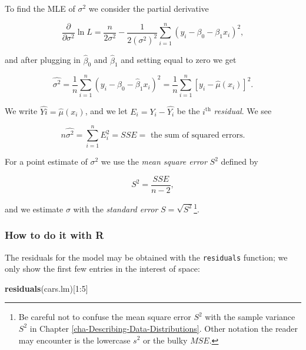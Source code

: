 \documentclass[]{book}
\newenvironment{Shaded}{\begin{snugshade}}{\end{snugshade}}
\newcommand{\KeywordTok}[1]{\textcolor[rgb]{0.13,0.29,0.53}{\textbf{{#1}}}}
\newcommand{\DecValTok}[1]{\textcolor[rgb]{0.00,0.00,0.81}{{#1}}}
\newcommand{\NormalTok}[1]{{#1}}
\let\rmarkdownfootnote\footnote%
\def\footnote{\protect\rmarkdownfootnote}
\numberwithin{equation}{chapter}
\numberwithin{figure}{chapter}
\theoremstyle{plain}
\theoremstyle{definition}
\theoremstyle{remark}
\theoremstyle{definition}
\theoremstyle{definition}
\theoremstyle{remark}
\begin{document}
To find the MLE of \(\sigma^{2}\) we consider the partial derivative

\begin{equation}
\frac{\partial}{\partial\sigma^{2}}\ln L=\frac{n}{2\sigma^{2}}-\frac{1}{2(\sigma^{2})^{2}}\sum_{i=1}^{n}(y_{i}-\beta_{0}-\beta_{1}x_{i})^{2},
\end{equation}

and after plugging in \(\hat{\beta}_{0}\) and \(\hat{\beta}_{1}\) and
setting equal to zero we get

\begin{equation}
\hat{\sigma^{2}}=\frac{1}{n}\sum_{i=1}^{n}(y_{i}-\hat{\beta}_{0}-\hat{\beta}_{1}x_{i})^{2}=\frac{1}{n}\sum_{i=1}^{n}[y_{i}-\hat{\mu}(x_{i})]^{2}.
\end{equation}

We write \(\hat{Yi}=\hat{\mu}(x_{i})\), and we let
\(E_{i}=Y_{i}-\hat{Y_{i}}\) be the \(i^{\mathrm{th}}\) \emph{residual}.
We see

\begin{equation}
n\hat{\sigma^{2}}=\sum_{i=1}^{n}E_{i}^{2}=SSE=\mbox{ the sum of squared errors.}
\end{equation}

For a point estimate of \(\sigma^{2}\) we use the \emph{mean square
error} \(S^{2}\) defined by

\begin{equation}
S^{2}=\frac{SSE}{n-2},
\end{equation}

and we estimate \(\sigma\) with the \emph{standard error}
\(S=\sqrt{S^{2}}\)\footnote{Be careful not to confuse the mean square
  error \(S^{2}\) with the sample variance \(S^{2}\) in Chapter
  \ref{cha-Describing-Data-Distributions}. Other notation the reader may
  encounter is the lowercase \(s^{2}\) or the bulky \(MSE\).}.

\subsubsection{How to do it with R}\label{how-to-do-it-with-r-50}

The residuals for the model may be obtained with the \texttt{residuals}
function; we only show the first few entries in the interest of space:

\begin{Shaded}
\begin{Highlighting}[]
\KeywordTok{residuals}\NormalTok{(cars.lm)[}\DecValTok{1}\NormalTok{:}\DecValTok{5}\NormalTok{]}
\end{Highlighting}
\end{Shaded}
\end{document}
